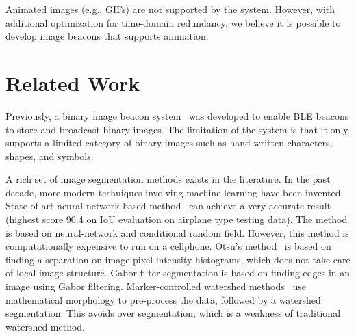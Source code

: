 
Animated images (e.g., GIFs) are not supported by the system. However, with additional optimization for time-domain redundancy, we believe it is possible to develop image beacons that supports animation.


\section{Related Work}
\label{sec:related}


Previously, a binary image beacon system~\cite{shaoyears} was developed to enable BLE beacons to store and broadcast binary images. The limitation of the system is that it only supports a limited category of binary images such as hand-written characters, shapes, and symbols.

A rich set of image segmentation methods exists in the literature. In the past decade, more modern techniques involving machine learning have been invented. State of art neural-network based method~\cite{zheng2015conditional} can achieve a very accurate result (highest score 90.4 on IoU evaluation on airplane type testing data). The method is based on neural-network and conditional random field. However, this method is computationally expensive to run on a cellphone. Otsu's method~\cite{otsu1975threshold} is based on finding a separation on image pixel intensity histograms, which does not take care of local image structure. Gabor filter segmentation is based on finding edges in an image using Gabor filtering. Marker-controlled watershed methods~\cite{parvati2009image} use mathematical morphology to pre-process the data, followed by a watershed segmentation. This avoids over segmentation, which is a weakness of traditional watershed method.


